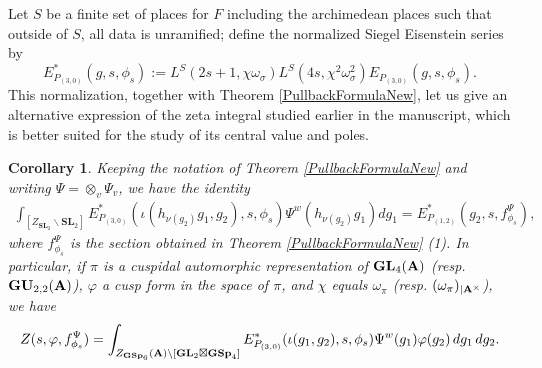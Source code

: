 \documentclass[11pt, reqno]{amsart}
\theoremstyle{plain}
\newtheorem{corollary}[theorem]{Corollary}
\theoremstyle{definition}
\theoremstyle{remark}
\theoremstyle{plain}
\def\SL{{\mathbf{SL}}}
\def\A{{\bf A}}
\def\GSp{{\mathbf{GSp}}}
\def\GU{{\mathbf{GU}}}
\def\GL{\mathbf{GL}}
\begin{document}
Let $S$ be a finite set of places for $F$ including the archimedean places such that outside of $S$, all data is unramified; define the normalized Siegel Eisenstein series by \[E_{P_{(3,0)}}^*\left(g,s,\phi_s\right):= L^S(2s+1, \chi\omega_{\sigma})L^S(4s, \chi^2\omega_{\sigma}^2) E_{P_{(3,0)}}\left(g,s,\phi_s\right). \]
This normalization, together with Theorem \ref{PullbackFormulaNew}, let us give an alternative expression of the zeta integral studied earlier in the manuscript, which is better suited for the study of its central value and poles.
\begin{corollary}\label{CorPullbackZeta}
Keeping the notation of Theorem \ref{PullbackFormulaNew} and writing $\Psi = \otimes_v \Psi_v$, we have the identity  
\begin{align*} \int_{[Z_{\SL_2}\backslash \SL_2]} E_{P_{(3,0)}}^*(\iota( h_{\nu(g_2)} g_1  , g_2), s,\phi_s) \Psi^w( h_{\nu(g_2)} g_1  ) d g_1 = E_{P_{(1,2)}}^*(g_2,s,f^{\Psi}_{\phi_s}),\end{align*}
where  $f^\Psi_{\phi_s}$ is the section obtained in Theorem \ref{PullbackFormulaNew} (1).
In particular, if $\pi$ is a cuspidal automorphic representation of $\GL_4(\A)$ (resp.  $\GU_{2,2}(\A)$), $\varphi$ a cusp form in the space of $\pi$, and $\chi $ equals $ \omega_{\pi}$ (resp. $ (\omega_{\pi})_{|\A^\times}$), we have \begin{align}\label{eq_Cor_Pullback}
   Z(s,\varphi, f^\Psi_{\phi_s}) = \int_{Z_{\GSp_6}(\A)\backslash [\GL_2\boxtimes \GSp_4]} E_{P_{(3,0)}}^*(\iota( g_1  , g_2), s,\phi_s) \Psi^w( g_1  ) \varphi(g_2)\, dg_1\,dg_2.
\end{align}
\end{corollary}
\end{document}
